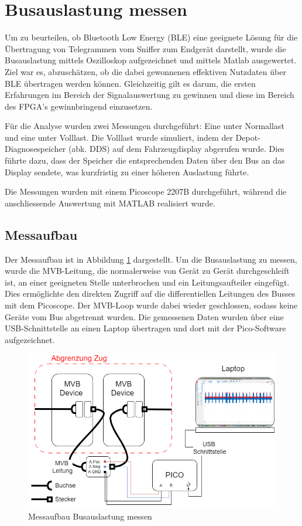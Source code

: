 \section{Busauslastung messen}
Um zu beurteilen, ob Bluetooth Low Energy (BLE) eine geeignete Lösung für die Übertragung von Telegrammen vom Sniffer zum Endgerät darstellt, wurde die Busauslastung mittels Oszilloskop aufgezeichnet und mittels Matlab ausgewertet. Ziel war es, abzuschätzen, ob die dabei gewonnenen effektiven Nutzdaten über BLE übertragen werden können. Gleichzeitig gilt es darum, die ersten Erfahrungen im Bereich der Signalauswertung zu gewinnen und diese im Bereich des FPGA's gewinnbringend einzusetzen.

Für die Analyse wurden zwei Messungen durchgeführt: Eine unter Normallast und eine unter Volllast. Die Volllast wurde simuliert, indem der Depot-Diagnosespeicher (abk. DDS) auf dem Fahrzeugdisplay abgerufen wurde. Dies führte dazu, dass der Speicher die entsprechenden Daten über den Bus an das Display sendete, was kurzfristig zu einer höheren Auslastung führte.

Die Messungen wurden mit einem Picoscope 2207B durchgeführt, während die anschliessende Auswertung mit MATLAB realisiert wurde.

\subsection{Messaufbau}

Der Messaufbau ist in Abbildung \ref{fig:MessaufbauBusauslastungMessen} dargestellt. Um die Busauslastung zu messen, wurde die MVB-Leitung, die normalerweise von Gerät zu Gerät durchgeschleift ist, an einer geeigneten Stelle unterbrochen und ein Leitungsaufteiler eingefügt. Dies ermöglichte den direkten Zugriff auf die differentiellen Leitungen des Busses mit dem Picoscope. Der MVB-Loop wurde dabei wieder geschlossen, sodass keine Geräte vom Bus abgetrennt wurden. Die gemessenen Daten wurden über eine USB-Schnittstelle an einen Laptop übertragen und dort mit der Pico-Software aufgezeichnet.

\begin{figure}[H]
    \centering
    \includegraphics[width=0.8\linewidth]{Figures/Chap3/Busauslastung/Messaufbau_PICO_IC2000.png}
    \caption{Messaufbau Busauslastung messen}
    \label{fig:MessaufbauBusauslastungMessen}
\end{figure}

